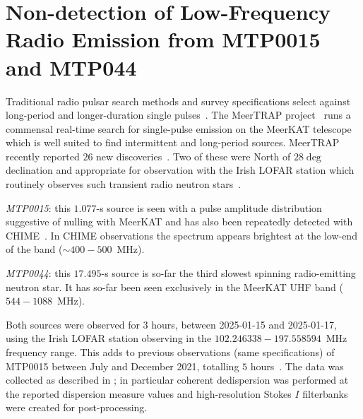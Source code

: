 
\section{Non-detection of Low-Frequency Radio Emission from MTP0015 and MTP044} \label{sec:mtp}

Traditional radio pulsar search methods and survey specifications select against long-period and longer-duration single pulses~\citep{morello}. The MeerTRAP project~\citep{sanidas} runs a commensal real-time search for single-pulse emission on the MeerKAT telescope~\citep{jonas} which is well suited to find intermittent and long-period sources. MeerTRAP recently reported $26$ new discoveries~\citep{meertrap}. Two of these were North of $28\deg$ declination and appropriate for observation with the Irish LOFAR station which routinely observes such transient radio neutron stars~\citep{mckenna_census_2024}.

\textit{MTP0015}: this $1.077$-s source is seen with a pulse amplitude distribution suggestive of nulling with MeerKAT and has also been repeatedly detected with CHIME~\citep{dong2023}. In CHIME observations the spectrum appears brightest at the low-end of the band ($\sim 400-500$~MHz). 


\textit{MTP0044}: this $17.495$-s source is so-far the third slowest spinning radio-emitting neutron star. It has so-far been seen exclusively in the MeerKAT UHF band ($544-1088$~MHz). 

Both sources were observed for $3$ hours, between 2025-01-15 and 2025-01-17, using the Irish LOFAR station observing in the $102.246338-197.558594$~MHz frequency range. This adds to previous observations (same specifications) of MTP0015 between July and December 2021, totalling $5$ hours~\citep{david_thesis}. The data was collected as described in \citet{David_JOSS}; in particular coherent dedispersion was performed at the reported dispersion measure values and high-resolution Stokes $I$ filterbanks were created for post-processing.

